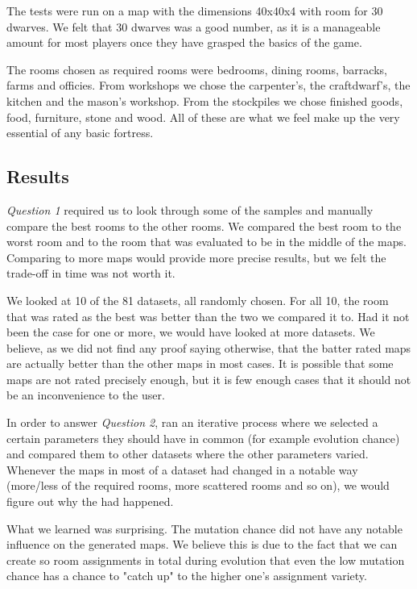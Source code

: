 The tests were run on a map with the dimensions 40x40x4 with room for 30 dwarves. We felt that 30 dwarves was a good number, as it is a manageable amount for most players once they have grasped the basics of the game.

The rooms chosen as required rooms were bedrooms, dining rooms, barracks, farms and officies. From workshops we chose the carpenter's, the craftdwarf's, the kitchen and the mason's workshop. From the stockpiles we chose finished goods, food, furniture, stone and wood. All of these are what we feel make up the very essential of any basic fortress.

\subsection{Results}

\textit{Question 1} required us to look through some of the samples and manually compare the best rooms to the other rooms. We compared the best room to the worst room and to the room that was evaluated to be in the middle of the maps. Comparing to more maps would provide more precise results, but we felt the trade-off in time was not worth it.

We looked at 10 of the 81 datasets, all randomly chosen. For all 10, the room that was rated as the best was better than the two we compared it to. Had it not been the case for one or more, we would have looked at more datasets. We believe, as we did not find any proof saying otherwise, that the batter rated maps are actually better than the other maps in most cases. It is possible that some maps are not rated precisely enough, but it is few enough cases that it should not be an inconvenience to the user.

In order to answer \textit{Question 2}, ran an iterative process where we selected a certain parameters they should have in common (for example evolution chance) and compared them to other datasets where the other parameters varied. Whenever the maps in most of a dataset had changed in a notable way (more/less of the required rooms, more scattered rooms and so on), we would figure out why the had happened.

What we learned was surprising. The mutation chance did not have any notable influence on the generated maps. We believe this is due to the fact that we can create so room assignments in total during evolution that even the low mutation chance has a chance to "catch up" to the higher one's assignment variety.

